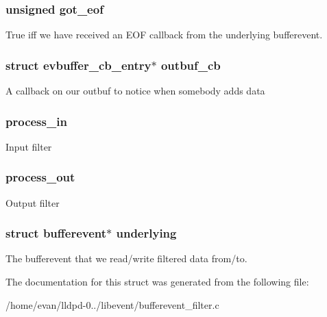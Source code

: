 \subsubsection[{got\-\_\-eof}]{\setlength{\rightskip}{0pt plus 5cm}unsigned {\bf got\-\_\-eof}}\label{structbufferevent__filtered_a3b64547292f52c97c61a22338765928c}
\-True iff we have received an \-E\-O\-F callback from the underlying bufferevent. 
\subsubsection[{outbuf\-\_\-cb}]{\setlength{\rightskip}{0pt plus 5cm}struct {\bf evbuffer\-\_\-cb\-\_\-entry}$\ast$ {\bf outbuf\-\_\-cb}}\label{structbufferevent__filtered_aaba8f48af30064e0972e59231278c55f}
\-A callback on our outbuf to notice when somebody adds data 
\subsubsection[{process\-\_\-in}]{ {\bf process\-\_\-in}}\label{structbufferevent__filtered_a114e95745c297dd5774d755c4db33a41}
\-Input filter 
\subsubsection[{process\-\_\-out}]{ {\bf process\-\_\-out}}\label{structbufferevent__filtered_af1d84f528bdb3ba4dbe9ede92069081f}
\-Output filter 
\subsubsection[{underlying}]{\setlength{\rightskip}{0pt plus 5cm}struct {\bf bufferevent}$\ast$ {\bf underlying}}\label{structbufferevent__filtered_a28dd39cec675d7f406ea714d8b4aa00c}
\-The bufferevent that we read/write filtered data from/to. 

\-The documentation for this struct was generated from the following file\-:\begin{DoxyCompactItemize}
\item 
/home/evan/lldpd-\/0../libevent/bufferevent\-\_\-filter.\-c\end{DoxyCompactItemize}
